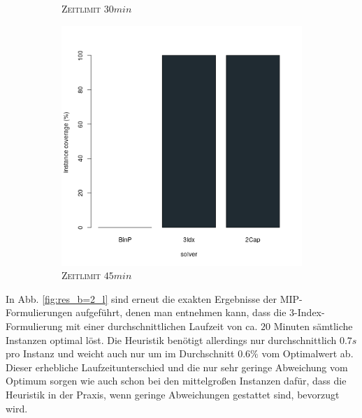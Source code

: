 \begin{figure}[H]
\begin{subfigure}[b]{0.3\textwidth}
\caption{\textsc{Zeitlimit} $30min$}
\label{fig:instance_cov_b=2_l_b}
\end{subfigure}
\hfill
\begin{subfigure}[b]{0.3\textwidth}
\centering
\includegraphics[width=1.2\textwidth]{img/solver_instance_coverage_b=2_l_2700s.png}
\caption{\textsc{Zeitlimit} $45min$}
\label{fig:instance_cov_b=2_l_c}
\end{subfigure}

\caption{}
\label{fig:instance_cov_b=2_l}
\end{figure}

In Abb. \ref{fig:res_b=2_l} sind erneut die exakten Ergebnisse der MIP-Formulierungen aufgeführt, denen man
entnehmen kann, dass die 3-Index-Formulierung mit einer durchschnittlichen Laufzeit von ca. $20$ Minuten sämtliche Instanzen
optimal löst. Die Heuristik benötigt allerdings nur durchschnittlich $0.7s$ pro Instanz und weicht auch nur um im Durchschnitt
$0.6 \%$ vom Optimalwert ab. Dieser erhebliche Laufzeitunterschied und die nur sehr geringe Abweichung vom Optimum sorgen wie auch
schon bei den mittelgroßen Instanzen dafür, dass die Heuristik in der Praxis, wenn geringe Abweichungen gestattet sind, bevorzugt wird.


